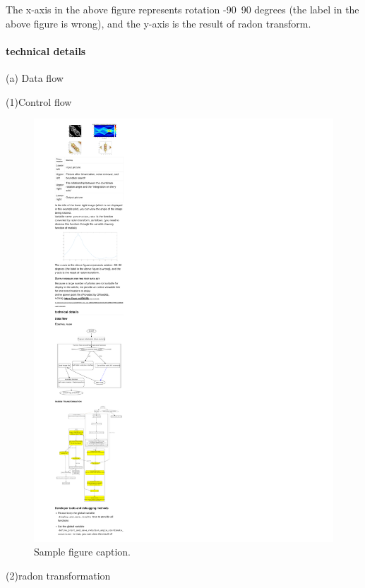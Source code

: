 \documentclass{article}
\begin{document}
The x-axis in the above figure represents rotation -90~90 degrees (the label in the above figure is wrong), and the y-axis is the result of radon transform.

\paragraph{technical details}

(a) Data flow

(1)Control flow

\begin{figure}
	\centering
	\includegraphics[width=0.7\linewidth]{f0.pdf}
	\caption{Sample figure caption.}
	\label{fig:f0pdf}
\end{figure}

(2)radon transformation
\end{document}
